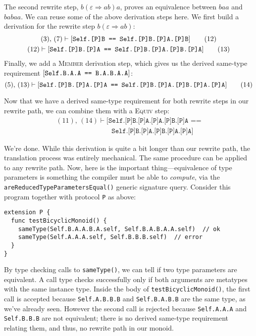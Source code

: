 \documentclass[../generics]{subfiles}
\begin{document}
The second rewrite step, $b(\varepsilon\Rightarrow ab)a$, proves an equivalence between $baa$ and $babaa$. We can reuse some of the above derivation steps here. We first build a derivation for the rewrite step $b(\varepsilon\Rightarrow ab)$:
\begin{gather*}
(3),\,(7)\vdash[\texttt{Self.[P]B == Self.[P]B.[P]A.[P]B}]\tag{12}\\
(12)\vdash[\texttt{Self.[P]B.[P]A == Self.[P]B.[P]A.[P]B.[P]A}]\tag{13}
\end{gather*}
Finally, we add a \textsc{Member} derivation step, which gives us the derived same-type requirement $[\texttt{Self.B.A.A == B.A.B.A.A}]$:
\[
(5),\,(13)\vdash[\texttt{Self.[P]B.[P]A.[P]A == Self.[P]B.[P]A.[P]B.[P]A.[P]A}]\tag{14}
\]

Now that we have a derived same-type requirement for both rewrite steps in our rewrite path, we can combine them with a \textsc{Equiv} step:
\begin{gather*}
(11),\,(14)\vdash[\texttt{Self.[P]B.[P]A.[P]A.[P]B.[P]A ==}\\
\qquad\qquad\qquad\qquad\texttt{Self.[P]B.[P]A.[P]B.[P]A.[P]A}]\tag{15}
\end{gather*}

We're done. While this derivation is quite a bit longer than our rewrite path, the translation process was entirely mechanical. The same procedure can be applied to any rewrite path. Now, here is the important thing---equivalence of type parameters is something the compiler must be able to \emph{compute}, via the \texttt{areReducedTypeParametersEqual()} generic signature query.
Consider this program together with protocol \texttt{P} as above:
\begin{Verbatim}
extension P {
  func testBicyclicMonoid() {
    sameType(Self.B.A.A.B.A.self, Self.B.A.B.A.A.self)  // ok
    sameType(Self.A.A.A.self, Self.B.B.B.self)  // error
  }
}
\end{Verbatim}
By type checking calls to \texttt{sameType()}, we can tell if two type parameters are equivalent. A call type checks successfully only if both arguments are metatypes with the same instance type. Inside the body of \texttt{testBicyclicMonoid()}, the first call is accepted because \verb|Self.A.B.B.B| and \verb|Self.B.A.B.B| are the same type, as we've already seen. However the second call is rejected because \verb|Self.A.A.A| and \verb|Self.B.B.B| are not equivalent; there is no derived same-type requirement relating them, and thus, no rewrite path in our monoid.
\end{document}
